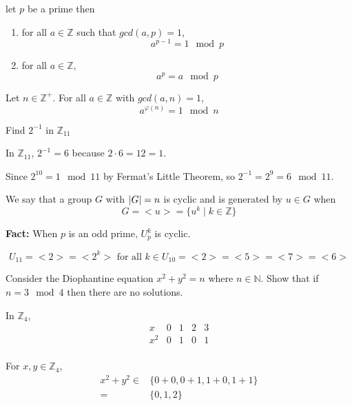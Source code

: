 \begin{thm}
let $p$ be a prime then
    \begin{enumerate}
        \item for all $a\in \mathbb{Z}$ such that $gcd(a,p) = 1$, \[a^{p-1} = 1 \mod p\]
        \item for all $a\in \mathbb{Z}$, \[a^p  = a \mod p\]
    \end{enumerate}
\end{thm}

\begin{thm}
Let $n \in \mathbb{Z}^+$. For all $a\in\mathbb{Z}$ with $gcd(a,n) = 1$, \[a^{\varphi (n)} = 1 \mod n\]
\end{thm}

\begin{exmp}
Find $2^{-1}$ in $\mathbb{Z}_11$
\end{exmp}

\begin{solution}[Solution 1]
In $\mathbb{Z}_11$, $2^{-1} = 6$ because $2\cdot 6 = 12 = 1$.
\end{solution}

\begin{solution}[Solution 2]
Since $2^{10} = 1 \mod 11$ by Fermat's Little Theorem, so $2^{-1} = 2^{9} = 6 \mod 11$.
\end{solution}

\begin{defn}[Cyclic]
We say that a group $G$ with $\left| G \right| = n$ is cyclic and is generated by $u\in G$ when \[G = <u> = \{u^k \mid  k\in\mathbb{Z}\}\]
\end{defn}

\textbf{Fact: }When $p$ is an odd prime, $U_p^{k}$ is cyclic.

\begin{rem}
\[U_11 = <2> = <2^k> \text{ for all }k\in U_{10} =  <2>= <5> = <7> = <6>\]
\end{rem}

\begin{exmp}
Consider the Diophantine equation $x^2+y^2 = n$ where $n\in\mathbb{N}$. Show that if $n=3 \mod 4$ then there are no solutions.
\end{exmp}
\begin{solution}
In $\mathbb{Z}_4$, \[
\begin{array}{ccccc}
    x & 0 & 1 & 2 & 3 \\
    x^2 & 0 & 1 & 0 & 1 \\
\end{array}\]

For $x,y\in\mathbb{Z}_4$,
\begin{align*}
    x^2+y^2 \in & \{0+0,0+1,1+0,1+1\}\\
    = & \{0,1,2\}
\end{align*}
\end{solution}


